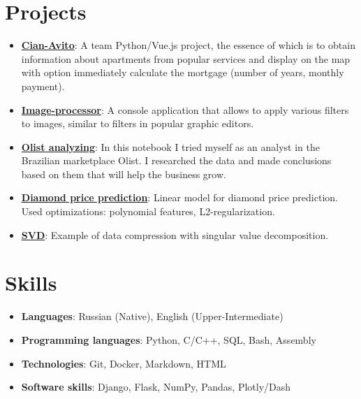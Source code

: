 \documentclass{resume}
\newcommand{\resumeItem}[2]{
  \item\small{
    \textbf{#1}{: #2 \vspace{-2pt}}
  }
}
\newcommand{\resumeSubItem}[2]{\resumeItem{#1}{#2}\vspace{-4pt}}
\newcommand{\resumeSubHeadingListStart}{\begin{itemize}[leftmargin=*]}
\newcommand{\resumeSubHeadingListEnd}{\end{itemize}}
\begin{document}
\section{Projects}
  \resumeSubHeadingListStart
    \resumeSubItem{\href{https://github.com/free001style/Cian_Avito_project}{Cian-Avito}}
      {A team Python/Vue.js project, the essence of which is to obtain information about apartments from popular services and display on the map with option immediately calculate the mortgage (number of years, monthly payment).}
      \bigskip
    \resumeSubItem{\href{https://github.com/free001style/image_processor}{Image-processor}}
      {A console application that allows to apply various filters to images, similar to filters in popular graphic editors.}
      \bigskip
     \resumeSubItem{\href{https://github.com/free001style/Deep_Python-HSE/blob/main/HW-1_data_analysis/Drobyshevskiy_Ilya_HW_1_data_analysis.ipynb}{Olist analyzing}}
      {In this notebook I tried myself as an analyst in the Brazilian marketplace Olist. I researched the data and made conclusions based on them that will help the business grow.}
      \bigskip
    \resumeSubItem{\href{https://github.com/free001style/LinearAlgebra-HSE/blob/main/homework-practice-02-linregr-Drobyshevskiy.ipynb}{Diamond price prediction}}
      {Linear model for diamond price prediction. Used optimizations: polynomial features, L2-regularization.}
      \bigskip
    \resumeSubItem{\href{https://github.com/free001style/LinearAlgebra-HSE/blob/main/homework_practice_03_linregr.ipynb}{SVD}}
      {Example of data compression with singular value decomposition.}
    
  \resumeSubHeadingListEnd

\section{Skills}
 \resumeSubHeadingListStart
    \item{
    \textbf{Languages}{: Russian (Native), English (Upper-Intermediate)}
    }
   \item{
     \textbf{Programming languages}{: Python, C/C++, SQL, Bash, Assembly}
   }
   \item{\textbf{Technologies}{: Git, Docker, Markdown, HTML}}
   \item{\textbf{Software skills}{: Django, Flask, NumPy, Pandas, Plotly/Dash}}
 \resumeSubHeadingListEnd
\end{document}
